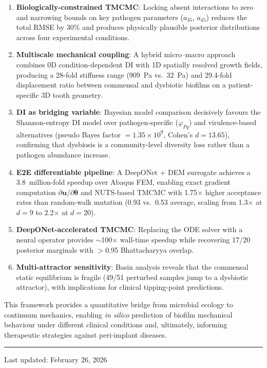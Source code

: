 \documentclass[11pt,a4paper]{article}
\begin{document}
\begin{enumerate}
  \item \textbf{Biologically-constrained TMCMC}: Locking absent interactions to zero and narrowing bounds on key pathogen parameters ($a_{35}$, $a_{45}$) reduces the total RMSE by 30\% and produces physically plausible posterior distributions across four experimental conditions.
  \item \textbf{Multiscale mechanical coupling}: A hybrid micro--macro approach combines 0D condition-dependent DI with 1D spatially resolved growth fields, producing a 28-fold stiffness range (909~Pa vs.\ 32~Pa) and 29.4-fold displacement ratio between commensal and dysbiotic biofilms on a patient-specific 3D tooth geometry.
  \item \textbf{DI as bridging variable}: Bayesian model comparison decisively favours the Shannon-entropy DI model over pathogen-specific ($\varphi_{Pg}$) and virulence-based alternatives (pseudo Bayes factor $= 1.35 \times 10^9$, Cohen's $d = 13.65$), confirming that dysbiosis is a community-level diversity loss rather than a pathogen abundance increase.
  \item \textbf{E2E differentiable pipeline}: A DeepONet + DEM surrogate achieves a 3.8~million-fold speedup over Abaqus FEM, enabling exact gradient computation $\partial\mathbf{u}/\partial\boldsymbol{\theta}$ and NUTS-based TMCMC with 1.75$\times$ higher acceptance rates than random-walk mutation (0.93 vs.\ 0.53 average, scaling from 1.3$\times$ at $d=9$ to 2.2$\times$ at $d=20$).
  \item \textbf{DeepONet-accelerated TMCMC}: Replacing the ODE solver with a neural operator provides $\sim$100$\times$ wall-time speedup while recovering 17/20 posterior marginals with $>$0.95 Bhattacharyya overlap.
  \item \textbf{Multi-attractor sensitivity}: Basin analysis reveals that the commensal static equilibrium is fragile (49/51 perturbed samples jump to a dysbiotic attractor), with implications for clinical tipping-point predictions.
\end{enumerate}

This framework provides a quantitative bridge from microbial ecology to continuum mechanics, enabling \textit{in silico} prediction of biofilm mechanical behaviour under different clinical conditions and, ultimately, informing therapeutic strategies against peri-implant diseases.

\vfill




\vfill
\noindent\rule{\textwidth}{0.4pt}
\small{Last updated: February 26, 2026}
\end{document}
